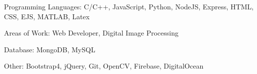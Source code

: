 

\begin{cvhonors}

  \cvhonor
    {Programming Languages: } %
    {C/C++, JavaScript, Python, NodeJS, Express, HTML, CSS, EJS, MATLAB, Latex} %
    {} %
    {} %

  \cvhonor
    {Areas of Work: } %
    {Web Developer, Digital Image Processing} %
    {} %
    {} %
    
  \cvhonor
    {Database: } %
    {MongoDB, MySQL} %
    {} %
    {} %
    
   \cvhonor
    {Other: } %
    {Bootstrap4, jQuery, Git, OpenCV, Firebase, DigitalOcean} %
    {} %
    {} %
\end{cvhonors}
